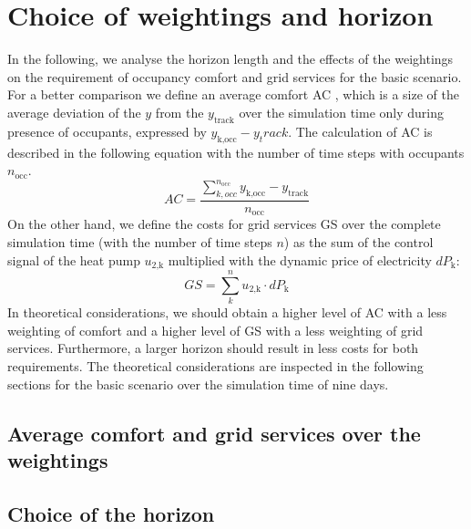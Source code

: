\section{Choice of weightings and horizon}
\label{Choise of weigtings and horizon}
In the following, we analyse the horizon length and the effects of the weightings on the requirement of occupancy comfort and grid services for the basic scenario. For a better comparison we define an average comfort AC , which is a size of the average deviation of the $y$ from the $y_\text{track}$ over the simulation time only during presence of occupants, expressed by $y_\text{k,occ} - y_track$. The calculation of AC is described in the following equation with the number of time steps with occupants $n_\text{occ}$.
\begin{equation}
    \label{eq:average comfort}
    AC = \frac{\sum_{k,occ}^{n_\text{occ}} y_\text{k,occ} - y_\text{track}}{n_\text{occ}}
\end{equation}
On the other hand, we define the costs for grid services GS  over the complete simulation time (with the number of time steps $n$) as the sum of the control signal of the heat pump $u_\text{2,k}$ multiplied with the dynamic price of electricity $dP_\text{k}$:
\begin{equation}
    GS = \sum_{k}^n u_\text{2,k}\cdot dP_\text{k}
\end{equation}
In theoretical considerations, we should obtain a higher level of AC with a less weighting of comfort and a higher level of GS with a less weighting of grid services. Furthermore, a larger horizon should result in less costs for both requirements. The theoretical considerations are inspected in the following sections for the basic scenario over the simulation time of nine days.   

\subsection{Average comfort and grid services over the weightings}
\label{subsec:Average comfort and grid services over the weightings}
\subsection{Choice of the horizon}
\label{subsec:ChoiceHorizon}